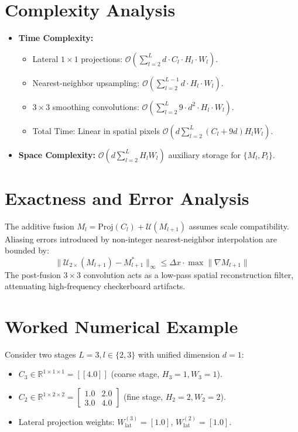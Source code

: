 \documentclass[11pt,a4paper]{article}
\theoremstyle{definition}
\begin{document}
\section{Complexity Analysis}

\begin{itemize}
    \item \textbf{Time Complexity:}
    \begin{itemize}
        \item Lateral $1 \times 1$ projections: $\mathcal{O}\left( \sum_{l=2}^L d \cdot C_l \cdot H_l \cdot W_l \right)$.
        \item Nearest-neighbor upsampling: $\mathcal{O}\left( \sum_{l=2}^{L-1} d \cdot H_l \cdot W_l \right)$.
        \item $3 \times 3$ smoothing convolutions: $\mathcal{O}\left( \sum_{l=2}^L 9 \cdot d^2 \cdot H_l \cdot W_l \right)$.
        \item Total Time: Linear in spatial pixels $\mathcal{O}\left( d \sum_{l=2}^L (C_l + 9d) H_l W_l \right)$.
    \end{itemize}
    \item \textbf{Space Complexity:} $\mathcal{O}\left( d \sum_{l=2}^L H_l W_l \right)$ auxiliary storage for $\{M_l, P_l\}$.
\end{itemize}

\section{Exactness and Error Analysis}

The additive fusion $M_l = \text{Proj}(C_l) + \mathcal{U}(M_{l+1})$ assumes scale compatibility. Aliasing errors introduced by non-integer nearest-neighbor interpolation are bounded by:
\begin{equation}
\|\mathcal{U}_{2\times}(M_{l+1}) - M_{l+1}^*\|_{\infty} \le \Delta x \cdot \max \|\nabla M_{l+1}\|
\end{equation}
The post-fusion $3 \times 3$ convolution acts as a low-pass spatial reconstruction filter, attenuating high-frequency checkerboard artifacts.

\section{Worked Numerical Example}

Consider two stages $L=3, l \in \{2, 3\}$ with unified dimension $d=1$:
\begin{itemize}
    \item $C_3 \in \mathbb{R}^{1 \times 1 \times 1} = [[4.0]]$ (coarse stage, $H_3=1, W_3=1$).
    \item $C_2 \in \mathbb{R}^{1 \times 2 \times 2} = \begin{bmatrix} 1.0 & 2.0 \\ 3.0 & 4.0 \end{bmatrix}$ (fine stage, $H_2=2, W_2=2$).
    \item Lateral projection weights: $W_{\text{lat}}^{(3)} = [1.0]$, $W_{\text{lat}}^{(2)} = [1.0]$.
\end{itemize}
\end{document}
